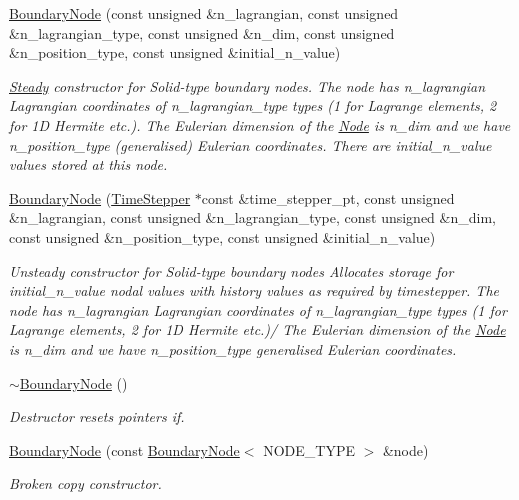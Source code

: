\begin{DoxyCompactItemize}
\hyperlink{classoomph_1_1BoundaryNode_a65d27f75e6e015ceb1978be7d3cd83bc}{Boundary\+Node} (const unsigned \&n\+\_\+lagrangian, const unsigned \&n\+\_\+lagrangian\+\_\+type, const unsigned \&n\+\_\+dim, const unsigned \&n\+\_\+position\+\_\+type, const unsigned \&initial\+\_\+n\+\_\+value)
\begin{DoxyCompactList}\small\item\em \hyperlink{classoomph_1_1Steady}{Steady} constructor for Solid-\/type boundary nodes. The node has n\+\_\+lagrangian Lagrangian coordinates of n\+\_\+lagrangian\+\_\+type types (1 for Lagrange elements, 2 for 1D Hermite etc.). The Eulerian dimension of the \hyperlink{classoomph_1_1Node}{Node} is n\+\_\+dim and we have n\+\_\+position\+\_\+type (generalised) Eulerian coordinates. There are initial\+\_\+n\+\_\+value values stored at this node. \end{DoxyCompactList}\item 
\hyperlink{classoomph_1_1BoundaryNode_a969b9b49766f702d755c71f3981cfe98}{Boundary\+Node} (\hyperlink{classoomph_1_1TimeStepper}{Time\+Stepper} $\ast$const \&time\+\_\+stepper\+\_\+pt, const unsigned \&n\+\_\+lagrangian, const unsigned \&n\+\_\+lagrangian\+\_\+type, const unsigned \&n\+\_\+dim, const unsigned \&n\+\_\+position\+\_\+type, const unsigned \&initial\+\_\+n\+\_\+value)
\begin{DoxyCompactList}\small\item\em Unsteady constructor for Solid-\/type boundary nodes Allocates storage for initial\+\_\+n\+\_\+value nodal values with history values as required by timestepper. The node has n\+\_\+lagrangian Lagrangian coordinates of n\+\_\+lagrangian\+\_\+type types (1 for Lagrange elements, 2 for 1D Hermite etc.)/ The Eulerian dimension of the \hyperlink{classoomph_1_1Node}{Node} is n\+\_\+dim and we have n\+\_\+position\+\_\+type generalised Eulerian coordinates. \end{DoxyCompactList}\item 
\hyperlink{classoomph_1_1BoundaryNode_a29f6d775e2f97943ad0588ed4df5de51}{$\sim$\+Boundary\+Node} ()
\begin{DoxyCompactList}\small\item\em Destructor resets pointers if. \end{DoxyCompactList}\item 
\hyperlink{classoomph_1_1BoundaryNode_a8502b4932002ab66f83090086d3f558a}{Boundary\+Node} (const \hyperlink{classoomph_1_1BoundaryNode}{Boundary\+Node}$<$ N\+O\+D\+E\+\_\+\+T\+Y\+PE $>$ \&node)
\begin{DoxyCompactList}\small\item\em Broken copy constructor. \end{DoxyCompactList}\item 

\end{DoxyCompactItemize}
